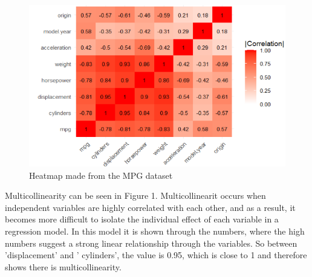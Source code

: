 \begin{figure}
	\centering
	\centering
	\includegraphics{billder/1.png}
	\caption{Heatmap made from the MPG dataset}
	\label{fig:1}
\end{figure}

\noindent Multicollinearity can be seen in Figure 1. Multicollinearit occurs when independent variables are highly correlated with each other, and as a result, it becomes more difficult to isolate the individual effect of each variable in a regression model.
In this model it is shown through the numbers, where the high numbers suggest a strong linear relationship through the variables. So between 'displacement' and ' cylinders', the value is 0.95, which is close to 1 and therefore shows there is multicollinearity.



